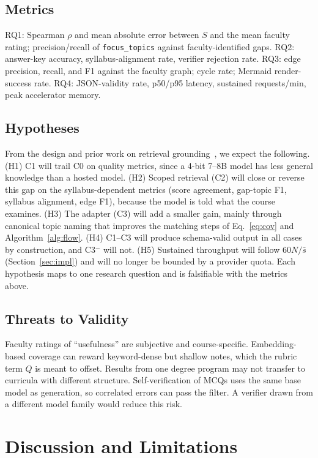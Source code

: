 \documentclass[conference]{IEEEtran}
\begin{document}
\subsection{Metrics}
RQ1: Spearman $\rho$ and mean absolute error between $S$ and the mean faculty
rating; precision/recall of \texttt{focus\_topics} against faculty-identified
gaps. RQ2: answer-key accuracy, syllabus-alignment rate, verifier rejection
rate. RQ3: edge precision, recall, and F1 against the faculty graph;
cycle rate; Mermaid render-success rate. RQ4: JSON-validity rate, p50/p95
latency, sustained requests/min, peak accelerator memory.

\subsection{Hypotheses}
From the design and prior work on retrieval grounding~\cite{ovadia2024finetuning,zhang2024raft},
we expect the following. (H1) C1 will trail C0 on quality metrics, since a
4-bit 7--8B model has less general knowledge than a hosted model. (H2) Scoped
retrieval (C2) will close or reverse this gap on the syllabus-dependent
metrics (score agreement, gap-topic F1, syllabus alignment, edge F1), because
the model is told what the course examines. (H3) The adapter (C3) will add a
smaller gain, mainly through canonical topic naming that improves the matching
steps of Eq.~\eqref{eq:cov} and Algorithm~\ref{alg:flow}. (H4) C1--C3 will
produce schema-valid output in all cases by construction, and C3$^-$ will not.
(H5) Sustained throughput will follow $60N/\bar{s}$
(Section~\ref{sec:impl}) and will no longer be bounded by a provider quota.
Each hypothesis maps to one research question and is falsifiable with the
metrics above.

\subsection{Threats to Validity}
Faculty ratings of ``usefulness'' are subjective and course-specific.
Embedding-based coverage can reward keyword-dense but shallow notes, which the
rubric term $Q$ is meant to offset. Results from one degree program may not
transfer to curricula with different structure. Self-verification of MCQs
uses the same base model as generation, so correlated errors can pass the
filter. A verifier drawn from a different model family would reduce this risk.

\section{Discussion and Limitations}
\end{document}
